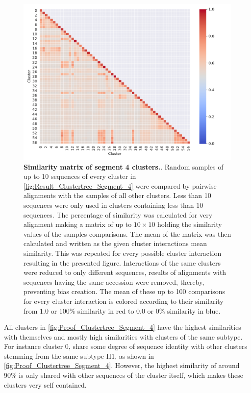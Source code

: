 \begin{figure}[!hbt]
    \centering
    \includegraphics[width=\textwidth]{Results/Cluster_Difference_Segment_4.pdf}
    \caption[Similarity matrix of segment 4 clusters]{\textbf{Similarity matrix of segment 4 clusters.}. Random samples of up to 10 sequences of every cluster in \autoref{fig:Result_Clustertree_Segment_4} were compared by pairwise alignments with the samples of all other clusters. Less than 10 sequences were only used in clusters containing less than 10 sequences. The percentage of similarity was calculated for very alignment making a matrix of up to $10\times10$ holding the similarity values of the samples comparisons. The mean of the matrix was then calculated and written as the given cluster interactions mean similarity. This was repeated for every possible cluster interaction resulting in the presented figure. Interactions of the same clusters were reduced to only different sequences, results of alignments with sequences having the same accession were removed, thereby, preventing bias creation. The mean of these up to 100 comparisons for every cluster interaction is colored according to their similarity from 1.0 or 100\% similarity in red to 0.0 or 0\% similarity in blue.}
    \label{fig:Proof_Clustertree_Segment_4}
\end{figure}

\vspace{1em}

All clusters in \autoref{fig:Proof_Clustertree_Segment_4} have the highest similarities with themselves and mostly high similarities with clusters of the same subtype. For instance cluster 0, share some degree of sequence identity with other clusters stemming from the same subtype H1, as shown in \autoref{fig:Proof_Clustertree_Segment_4}. However, the highest similarity of around 90\% is only shared with other sequences of the cluster itself, which makes these clusters very self contained. 

